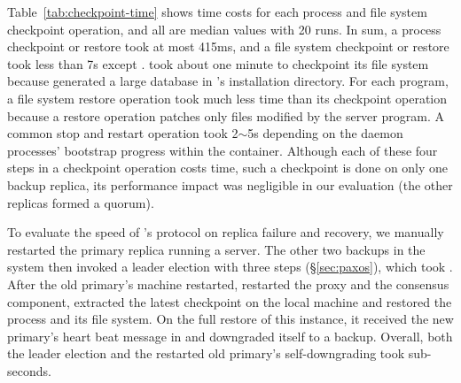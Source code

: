 Table~\ref{tab:checkpoint-time} shows time costs for each process and file 
system checkpoint operation, and all are median values with 
20 runs. In sum, a process checkpoint or restore took at most 415ms, and a file 
system checkpoint or restore took less than 7s except \mysql. \mysql took about 
one minute to checkpoint its file system because \sysbench generated a large 
database in \mysql's installation directory. For each program, a file system 
restore operation took much less time than its checkpoint operation because a 
restore 
operation patches only files modified by the server program. A common \lxc stop 
and restart operation took 2$\sim$5s depending on the daemon processes' 
bootstrap progress within the container. Although each of these four steps in a 
\xxx checkpoint operation costs time, such a checkpoint is done on only one 
backup replica, its performance impact was negligible in our evaluation (the 
other replicas formed a quorum).

To evaluate the speed of \xxx's \paxos protocol on replica failure and 
recovery, we manually restarted the primary replica running a \mongoose server. 
The other two backups in the system then invoked a leader election with three 
steps (\S\ref{sec:paxos}), which took \recovertime. After 
the old primary's machine restarted, \xxx restarted the proxy and the 
consensus component, extracted the latest \mongoose checkpoint on the local 
machine and restored the \mongoose process and its file system. On the full 
restore of this \xxx instance, it received the new primary's heart beat message 
in \downgradetime and downgraded itself to a backup. Overall, both the \paxos 
leader election and the restarted old primary's self-downgrading took 
sub-seconds.



